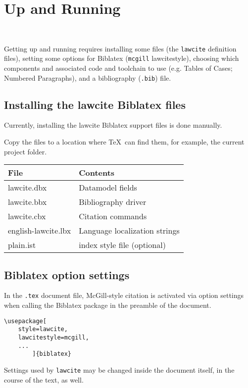 \newpage
\section{Up and Running}
\

\bigskip
{\small
\secttoc
}


\bigskip
Getting up and running requires installing some files (the \texttt{lawcite} definition files), setting some options for Biblatex (\texttt{mcgill} lawcitestyle), choosing which components and associated code and toolchain to use (e.g. Tables of Cases; Numbered Paragraphs), and a bibliography (\texttt{.bib}) file.
\subsection{Installing the lawcite Biblatex files}
Currently, installing the lawcite Biblatex support files is done manually.

Copy the files to a location where \TeX\ can find them, for example, the current project folder.

\medskip
\begin{tabular}{ll}
\hline
\theadcolour File & Contents \\
\hline
lawcite.dbx & Datamodel fields \\
lawcite.bbx & Bibliography driver \\
lawcite.cbx &  Citation commands \\
english-lawcite.lbx & Language localization strings \\
plain.ist & index style file (optional)\\
\hline
\end{tabular}



\subsection{Biblatex option settings}
In the \texttt{.tex} document file, McGill-style citation is activated via option settings when calling the Biblatex package in the preamble of the document.

\begin{verbatim}
\usepackage[
	style=lawcite, 
	lawcitestyle=mcgill,
	...
		]{biblatex}
\end{verbatim}

Settings used by \texttt{lawcite} may be changed inside the document itself, in the course of the text, as well.

